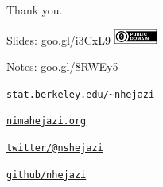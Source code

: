 \documentclass[12pt,t,handout]{beamer}
\begin{document}
\begin{frame}[c]{Thank you.}

\Large
Slides: \href{https://goo.gl/i3CxL9}{goo.gl/i3CxL9} \quad
\includegraphics[height=5mm]{Figs/cc-zero.png}

\vspace{5mm}
Notes: \href{https://goo.gl/8RWEy5}{goo.gl/8RWEy5}

\vspace{5mm}
\href{https://www.stat.berkeley.edu/~nhejazi}{\tt stat.berkeley.edu/\textasciitilde{}nhejazi}

\vspace{5mm}
\href{http://nimahejazi.org}{\tt nimahejazi.org}

\vspace{5mm}
\href{https://twitter.com/nshejazi}{\tt twitter/@nshejazi}

\vspace{5mm}
\href{https://github.com/nhejazi}{\tt github/nhejazi}


\end{frame}

\end{document}
